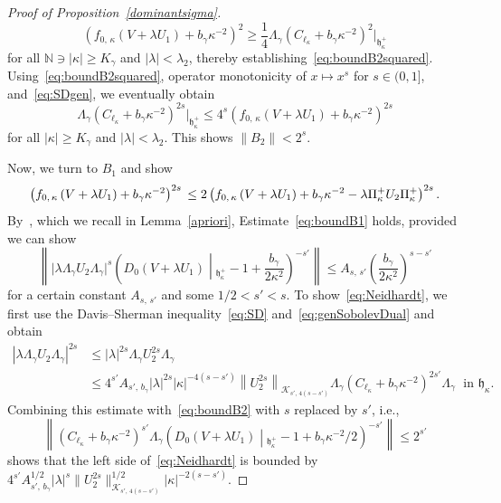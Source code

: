 \documentclass[10pt]{amsart}
\theoremstyle{definition}
\newcommand*\nz{\mathbb{N}}
\newcommand*\cK{\mathcal{K}}
\newcommand*\gh{\mathfrak{h}}
\newcommand*\ghpk{{\gh^+_\kappa}}
\newcommand*\ppp{\Pi^+_\kappa}
\begin{document}
\begin{proof}[Proof of Proposition~\ref{dominantsigma}]
\begin{equation}
\left(f_{0,\,\kappa}\left(V+\lambda U_1\right)+b_\gamma\kappa^{-2}\right)^2
\geq \frac14 \Lambda_\gamma\left(C_{\ell_\kappa}+b_\gamma\kappa^{-2}\right)^2\big|_\ghpk
\end{equation}
for all $\nz\ni|\kappa|\geq K_\gamma$ and $|\lambda|<\lambda_2$, thereby establishing~\eqref{eq:boundB2squared}. Using~\eqref{eq:boundB2squared}, operator monotonicity of $x\mapsto x^s$ for $s\in(0,1]$, and~\eqref{eq:SDgen}, we eventually obtain
\begin{equation}\label{eq:boundB2}
\Lambda_\gamma\left(C_{\ell_\kappa}+b_\gamma\kappa^{-2}\right)^{2s}\big|_\ghpk
\leq 4^s\left(f_{0,\,\kappa}\left(V+\lambda U_1\right)+b_\gamma\kappa^{-2}\right)^{2s}
\end{equation}
for all $|\kappa|\geq K_\gamma$ and $|\lambda|<\lambda_2$. This shows $\|B_2\|<2^s$.

Now, we turn to $B_1$ and show
\begin{equation}\label{eq:boundB1}
\left(f_{0,\,\kappa}\left(V+\lambda U_1\right)+b_\gamma\kappa^{-2}\right)^{2s}\\
\leq 2\left(f_{0,\,\kappa}\left(V+\lambda U_1\right)+b_\gamma\kappa^{-2}-\lambda \ppp U_2\ppp\right)^{2s}.
\end{equation}
By~\cite[Lemma~3.4]{Franketal2020P}, which we recall in Lemma~\ref{apriori}, Estimate~\eqref{eq:boundB1} holds, provided we can show
\begin{equation}\label{eq:Neidhardt}
\left\|\big|\lambda \Lambda_\gamma U_2\Lambda_\gamma\big|^{s}\left(D_0(V+\lambda U_1)\middle|_{\ghpk}-1+\frac{b_\gamma}{2\kappa^2}\right)^{-s'}\right\|
\leq A_{s,\,s'}\left(\frac{b_\gamma}{2\kappa^2}\right)^{s-s'}
\end{equation}
for a certain constant $A_{s,\,s'}$ and some $1/2<s'<s$. To show~\eqref{eq:Neidhardt}, we first use the Davis--Sherman inequality~\eqref{eq:SD} and~\eqref{eq:genSobolevDual} and obtain
\begin{align*}
\left|\lambda \Lambda_\gamma U_2\Lambda_\gamma\right|^{2s}
&\leq |\lambda|^{2s} \Lambda_\gamma U_2^{2s}\Lambda_\gamma\\
&\leq 4^{s'}A_{s',\,b_\gamma} |\lambda|^{2s} |\kappa|^{-4(s-s')}\left\|U_2^{2s}\right\|_{\cK_{s',\,4\left(s-s'\right)}}\Lambda_\gamma\left(C_{\ell_\kappa}+b_\gamma\kappa^{-2}\right)^{2s'}\Lambda_\gamma
\;\text{ in } \gh_{\kappa}.
\end{align*}
Combining this estimate with~\eqref{eq:boundB2} with $s$ replaced by $s'$, i.e.,
\[
\left\|\left(C_{\ell_\kappa}+b_\gamma\kappa^{-2}\right)^{s'}\Lambda_\gamma\left(D_0\left(V+\lambda U_1\right)\middle|_\ghpk-1+b_\gamma\kappa^{-2}/2\right)^{-s'}\right\| \leq 2^{s'}
\]
shows that the left side of~\eqref{eq:Neidhardt} is bounded by $4^{s'}A_{s',\,b_\gamma}^{1/2}|\lambda|^s\|U_2^{2s}\|_{\cK_{s',\,4(s-s')}}^{1/2} |\kappa|^{-2(s-s')}$.


\end{proof}
\end{document}
